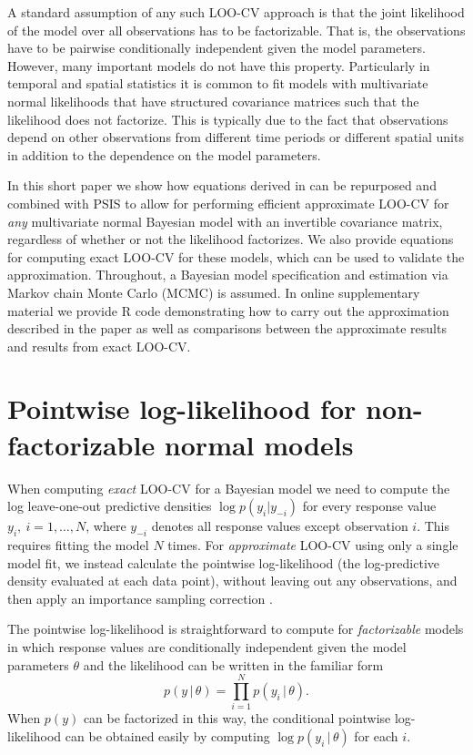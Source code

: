 \documentclass[11pt]{article}
\begin{document}
A standard assumption of any such LOO-CV approach is that the joint likelihood
of the model over all observations has to be factorizable. That is, the
observations have to be pairwise conditionally independent given the model
parameters. However, many important models do not have this property.
Particularly in temporal and spatial statistics it is common to
fit models with multivariate normal likelihoods that have structured covariance
matrices such that the likelihood does not factorize. This is typically due to the 
fact that observations depend on other observations from different time periods 
or different spatial units in addition to the dependence on the model parameters. 

In this short paper we show how equations derived in \cite{sundararajan2001} can
be repurposed and combined with PSIS to allow for performing efficient
approximate LOO-CV for \emph{any} multivariate normal Bayesian model with an
invertible covariance matrix, regardless of whether or not the likelihood
factorizes. We also provide equations for computing exact LOO-CV for these
models, which can be used to validate the approximation. Throughout, a Bayesian
model specification and estimation via Markov chain Monte Carlo (MCMC) is
assumed. In online supplementary material we provide R code demonstrating how to
carry out the approximation described in the paper as well as comparisons
between the approximate results and results from exact LOO-CV.


\section{Pointwise log-likelihood for non-factorizable normal models}
\label{sec-pointwise}

When computing \emph{exact} LOO-CV for a Bayesian model we need to compute the
log leave-one-out predictive densities $\log{p(y_i | y_{-i})}$ for every
response value $y_i, \: i = 1, \ldots, N$, where $y_{-i}$ denotes all response
values except observation $i$. This requires fitting the model $N$ times. For
\emph{approximate} LOO-CV using only a single model fit, we instead calculate
the pointwise log-likelihood (the log-predictive density evaluated at
each data point), without leaving out any observations, and then apply an
importance sampling correction \citep{vehtari2017loo}.

The pointwise log-likelihood is straightforward to compute for
\emph{factorizable} models in which response values are conditionally
independent given the model parameters $\theta$ and the likelihood can be
written in the familiar form
%
\begin{equation}
p(y \,|\, \theta) = \prod_{i=1}^N p(y_i \,|\, \theta).
\end{equation}
%
When $p(y)$ can be factorized in this way, the conditional pointwise
log-likelihood can be obtained easily by computing $\log p(y_i \,|\, \theta)$
for each $i$.
\end{document}
